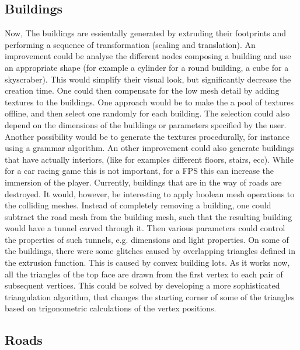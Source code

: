 \documentclass[conference]{IEEEtran}
\begin{document}
\subsection{Buildings}
Now, The buildings are essientally generated by extruding their footprints and performing a sequence of transformation (scaling and translation). An improvement could be analyse the different nodes composing a building and use an appropriate shape (for example a cylinder for a round building, a cube for a skyscraber). This would simplify their visual look, but significantly decrease the creation time. One could then compensate for the low mesh detail by adding textures to the buildings. One approach would be to make the a pool of textures offline, and then select one randomly for each building. The selection could also depend on the dimensions of the buildings or parameters specified by the user. Another possibility would be to generate the textures procedurally, for instance using a grammar algorithm. An other improvement could also generate buildings that have actually interiors, (like for examples different floors, stairs, ecc). While for a car racing game this is not important, for a FPS this can increase the immersion of the player. \newline\newline
Currently, buildings that are in the way of roads are destroyed. It would, however, be interesting to apply boolean mesh operations to the colliding meshes. Instead of completely removing a building, one could subtract the road mesh from the building mesh, such that the resulting building would have a tunnel carved through it. Then various parameters could control the properties of such tunnels, e.g. dimensions and light properties.\newline\newline
 On some of the buildings, there were some glitches caused by overlapping triangles defined in the extrusion function. This is caused by convex building lots. As it works now, all the triangles of the top face are drawn from the first vertex to each pair of subsequent vertices. This could be solved by developing a more sophisticated triangulation algorithm, that changes the starting corner of some of the triangles based on trigonometric calculations of the vertex positions. 

\subsection{Roads}
\end{document}
